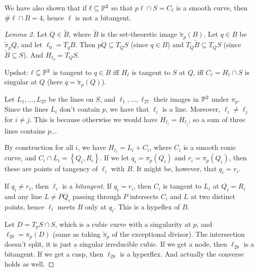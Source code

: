 \documentclass[11pt]{amsart}
\let\til\widetilde
\begin{document}
\begin{remark} We have also shown that if $\ell \subseteq \P^2$ so that $\overline{p \ell} \cap S = C_\ell$ is a smooth curve, then $\# \ell\cap B = 4$, hence $\ell$ is not a bitangent.
\end{remark}

\begin{proof}[Lemma 2] Let $Q\in \til{B}$, where $\til{B}$ is the set-theoretic image $\til{\pi}_p(B)$. Let $q\in B$ be $\til{\pi}_p Q$, and let $\ell_0 = T_q B$. Then $\overline{pQ} \subseteq T_Q S$ (since $q\in B$) and $T_Q \til{B} \subseteq T_Q S$ (since $\til{B} \subseteq S$). And $H_{\ell_0} = T_Q S$.

Upshot: $\ell \subseteq \P^2$ is tangent to $q\in B$ iff $H_\ell$ is tangent to $S$ at $Q$, iff $C_\ell = H_\ell\cap S$ is singular at $Q$ (here $q = \til{\pi}_p(Q)$).

Let $L_1, \ldots, L_{27}$ be the lines on $S$, and $\ell_1, \ldots, \ell_{27}$ their images in $\P^2$ under $\pi_p$. Since the lines $L_i$ don't contain $p$, we have that $\ell_i$ is a line. Moreover, $\ell_i \ne \ell_j$ for $i\ne j$. This is because otherwise we would have $H_{\ell_i} = H_{\ell_j}$, so a sum of three lines contains $p$...

By construction for all $i$, we have $H_{\ell_i} = L_i + C_i$, where $C_i$ is a smooth conic curve, and $C_i \cap L_i = \left\{ Q_i,R_i \right\}$. If we let $q_i = \pi_p(Q_i)$ and $r_i = \pi_p(Q_i)$, then these are points of tangency of $\ell_i$ with $B$. It might be, however, that $q_i = r_i$.

If $q_i \ne r_i$, then $\ell_i$ is a \textit{bitangent}. If $q_i = r_i$, then $C_i$ is tangent to $L_i$ at $Q_i = R_i$ and any line $L \ne \overline{PQ_i}$ passing through $P$ intersects $C_i$ and $L$ at two distinct points, hence $\ell_i$ meets $B$ only at $q_i$. This is a hypeflex of $B$.

Let $D = T_p S \cap S$, which is a cubic curve with a singularity at $p$, and $\ell_{28} = \pi_p(D)$ (same as taking $\til{\pi}_p$ of the exceptional divisor). The intersection doesn't split, it is just a singular irreducible cubic. If we get a node, then $\ell_{28}$ is a bitangent. If we get a cusp, then $\ell_{28}$ is a hyperflex. And actually the converse holds as well.
\end{proof}

\subsection{}
\end{document}
